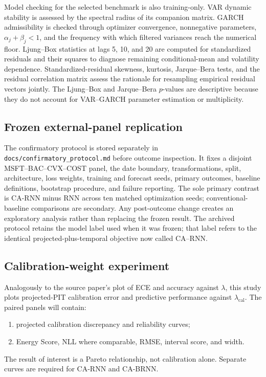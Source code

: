 \documentclass[11pt]{article}
\begin{document}
Model checking for the selected benchmark is also training-only. VAR dynamic
stability is assessed by the spectral radius of its companion matrix. GARCH
admissibility is checked through optimizer convergence, nonnegative parameters,
$\alpha_j+\beta_j<1$, and the frequency with which filtered variances reach the
numerical floor. Ljung--Box statistics at lags 5, 10, and 20 are computed for
standardized residuals and their squares to diagnose remaining conditional-mean
and volatility dependence. Standardized-residual skewness, kurtosis,
Jarque--Bera tests, and the residual correlation matrix assess the rationale for
resampling empirical residual vectors jointly. The Ljung--Box and Jarque--Bera
$p$-values are descriptive because they do not account for VAR--GARCH parameter
estimation or multiplicity.

\subsection{Frozen external-panel replication}

The confirmatory protocol is stored separately in
\texttt{docs/confirmatory\_protocol.md} before outcome inspection. It fixes a
disjoint MSFT--BAC--CVX--COST panel, the date boundary, transformations, split,
architecture, loss weights, training and forecast seeds, primary outcomes,
baseline definitions, bootstrap procedure, and failure reporting. The sole
primary contrast is CA-RNN minus RNN across ten matched optimization
seeds; conventional-baseline comparisons are secondary. Any post-outcome change
creates an exploratory analysis rather than replacing the frozen result.
The archived protocol retains the model label used when it was frozen; that label
refers to the identical projected-plus-temporal objective now called CA--RNN.

\subsection{Calibration-weight experiment}

Analogously to the source paper's plot of ECE and accuracy against $\lambda$, this
study plots projected-PIT calibration error and predictive performance against
$\lambda_{\mathrm{cal}}$. The paired panels will contain:
\begin{enumerate}
    \item projected calibration discrepancy and reliability curves;
    \item Energy Score, NLL where comparable, RMSE, interval score, and width.
\end{enumerate}
The result of interest is a Pareto relationship, not calibration alone. Separate
curves are required for CA-RNN and CA-BRNN.
\end{document}
